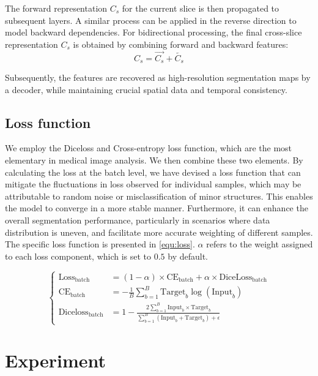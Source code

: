 \documentclass[AMA,Times1COL]{WileyNJDv5} %
\begin{document}
The forward representation \( C_s \) for the current slice is then propagated to subsequent layers. A similar process can be applied in the reverse direction to model backward dependencies. For bidirectional processing, the final cross-slice representation \( C_s \) is obtained by combining forward and backward features: 
\begin{equation}
   C_s = \overrightarrow{C_s} + \overleftarrow{C_s} 
\end{equation}

Subsequently, the features are recovered as high-resolution segmentation maps by a decoder, while maintaining crucial spatial data and temporal consistency. 

\subsection{Loss function}
We employ the Diceloss and Cross-entropy loss function, which are the most elementary in medical image analysis. We then combine these two elements. By calculating the loss at the batch level, we have devised a loss function that can mitigate the fluctuations in loss observed for individual samples, which may be attributable to random noise or misclassification of minor structures. This enables the model to converge in a more stable manner. Furthermore, it can enhance the overall segmentation performance, particularly in scenarios where data distribution is uneven, and facilitate more accurate weighting of different samples. The specific loss function is presented in \eqref{equ:loss}. $\alpha$ refers to the weight assigned to each loss component, which is set to $0.5$ by default.

\begin{equation}
\label{equ:loss}
\left\{
\begin{aligned}
\text{Loss}_{\text{batch}} &= (1-\alpha)\times\text{CE}_{\text{batch}}+\alpha\times\text{DiceLoss}_{\text{batch}} \\
\mathrm{CE}_{\mathrm{batch}} &= -\frac{1}{B}\sum_{b=1}^{B}\text{Target}_{b}\log(\text{Input}_{b}) \\
\mathrm{Diceloss}_{\mathrm{batch}} &= 1-\frac{2\sum_{b=1}^{B}\mathrm{Input}_{b}^{}\times\mathrm{Target}_{b}^{}}{\sum_{b=1}^{B}\left(\mathrm{Input}_{b}^{}+\mathrm{Target}_{b}^{}\right)+\epsilon}
\end{aligned}
\right.
\end{equation}

\section{Experiment}
\end{document}
